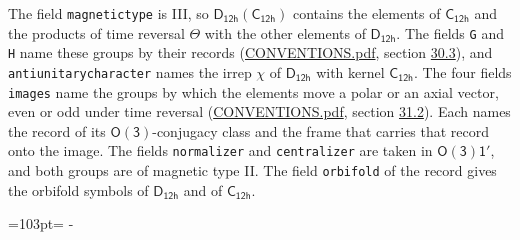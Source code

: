\documentclass[10pt,a4paper]{article}
\newcommand{\needspace}[1]{\par\penalty-100\begingroup\dimen0=#1\relax\dimen2=\pagegoal
  \advance\dimen2-\pagetotal\ifdim\dimen0>\dimen2\relax\ifdim\dimen2>0pt\vfil\break\fi\fi
  \endgroup}
\numberwithin{equation}{section}
\newcommand{\grp}[1]{\mathsf{#1}}
\begin{document}
The field \texttt{magnetictype} is III, so $\grp{D_{12h}}(\grp{C_{12h}})$ contains the elements of $\grp{C_{12h}}$ and the products of time reversal $\varTheta$ with the other elements of $\grp{D_{12h}}$. The fields \texttt{G} and \texttt{H} name these groups by their records (\href{../../CONVENTIONS.pdf}{CONVENTIONS.pdf}, section \href{../../CONVENTIONS.pdf\#conv.30.3}{30.3}), and \texttt{antiunitarycharacter} names the irrep $\chi$ of $\grp{D_{12h}}$ with kernel $\grp{C_{12h}}$. The four fields \texttt{images} name the groups by which the elements move a polar or an axial vector, even or odd under time reversal (\href{../../CONVENTIONS.pdf}{CONVENTIONS.pdf}, section \href{../../CONVENTIONS.pdf\#conv.31.2}{31.2}). Each names the record of its $\grp{O(3)}$-conjugacy class and the frame that carries that record onto the image. The fields \texttt{normalizer} and \texttt{centralizer} are taken in $\grp{O(3)1'}$, and both groups are of magnetic type II. The field \texttt{orbifold} of the record gives the orbifold symbols of $\grp{D_{12h}}$ and of $\grp{C_{12h}}$.
\needspace{103pt}
\end{document}
